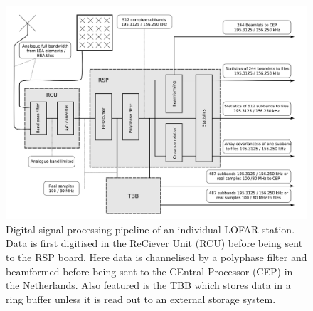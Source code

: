 \begin{figure}[ht]
    \centering
    \includegraphics[width=0.75\columnwidth]{Images/Digital_signal_processing.png}
    \caption[Digital signal processing pipeline of an individual LOFAR station.]{Digital signal processing pipeline of an individual LOFAR station. Data is first digitised in the ReCiever Unit (RCU) before being sent to the RSP board. Here data is channelised by a polyphase filter and beamformed before being sent to the CEntral Processor (CEP) in the Netherlands. Also featured is the TBB which stores data in a ring buffer unless it is read out to an external storage system. }
    \label{fig:sig_pipe}
\end{figure}

